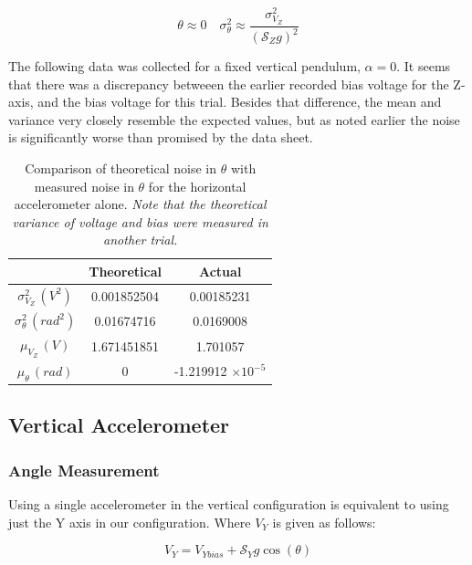 \documentclass{article}
\theoremstyle{plain}
\theoremstyle{definition}
\theoremstyle{remark}
\newcommand{\Sens}{\mathcal{S}}
\providecommand{\e}[1]{\ensuremath{\times 10^{#1}}}
\begin{document}
$$ \theta \approx 0 \quad \sigma^2_{\theta} \approx \frac{\sigma^2_{V_{Z}}}{(\Sens_{Z} g)^2}$$

The following data was collected for a fixed vertical pendulum, $\alpha = 0$.  It seems that there was a discrepancy betweeen the earlier recorded bias voltage for the Z-axis, and the bias voltage for this trial.  Besides that difference, the mean and variance very closely resemble the expected values, but as noted earlier the noise is significantly worse than promised by the data sheet.  

\begin{table}
\begin{center}
    \begin{tabular}{|c|c|c|}
        \hline
        ~                   & Theoretical  & Actual \\ \hline
        $\sigma^2_{V_{Z}} \, (V^2)$    & 0.001852504            &  0.00185231      \\ 
        $\sigma^2_{\theta} \, (rad^2)$ & 0.01674716            & 0.0169008      \\ 
        $\mu_{V_{Z}} \, (V)$       & 1.671451851            &  1.701057      \\ 
        $\mu_{\theta} \, (rad)$      & 0            &  -1.219912 \e{-5}     \\
        \hline
    \end{tabular}
\caption{Comparison of theoretical noise in $\theta$ with measured noise in $\theta$ for the horizontal accelerometer alone. \emph{Note that the theoretical variance of voltage and bias were measured in another trial.}}
\label{Noise_horizontal_T}
\end{center}
\end{table}

\subsection{Vertical Accelerometer}

\subsubsection{Angle Measurement}

Using a single accelerometer in the vertical configuration is equivalent to using just the Y axis in our configuration.  Where $V_{Y}$ is given as follows:

$$ V_{Y} = V_{Ybias} + \Sens_{Y} g \cos(\theta) $$
\end{document}
